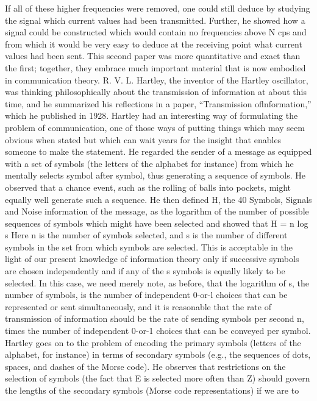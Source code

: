 If all of these higher frequencies were removed, one could still
deduce by studying the signal which current values had been
transmitted. Further, he showed how a signal could be constructed
which would contain no frequencies above N cps and from which
it would be very easy to deduce at the receiving point what current
values had been sent. This second paper was more quantitative and
exact than the first; together, they embrace much important material
that is now embodied in communication theory.
R. V. L. Hartley, the inventor of the Hartley oscillator, was
thinking philosophically about the transmission of information at
about this time, and he summarized his reflections in a paper,
“Transmission oflnformation,” which he published in 1928.
Hartley had an interesting way of formulating the problem of
communication, one of those ways of putting things which may
seem obvious when stated but which can wait years for the insight
that enables someone to make the statement. He regarded the
sender of a message as equipped with a set of symbols (the letters
of the alphabet for instance) from which he mentally selects symbol
after symbol, thus generating a sequence of symbols. He observed
that a chance event, such as the rolling of balls into pockets, might
equally well generate such a sequence. He then defined H, the
40 Symbols, Signals and Noise
information of the message, as the logarithm of the number of
possible sequences of symbols which might have been selected and
showed that
H = n log s
Here n is the number of symbols selected, and s is the number of
different symbols in the set from which symbols are selected.
This is acceptable in the light of our present knowledge of
information theory only if successive symbols are chosen independently
and if any of the s symbols is equally likely to be selected.
In this case, we need merely note, as before, that the logarithm of
s, the number of symbols, is the number of independent 0-or-l
choices that can be represented or sent simultaneously, and it is
reasonable that the rate of transmission of information should be
the rate of sending symbols per second n, times the number of
independent 0-or-1 choices that can be conveyed per symbol.
Hartley goes on to the problem of encoding the primary symbols
(letters of the alphabet, for instance) in terms of secondary symbols
(e.g., the sequences of dots, spaces, and dashes of the Morse code).
He observes that restrictions on the selection of symbols (the fact
that E is selected more often than Z) should govern the lengths of
the secondary symbols (Morse code representations) if we are to
